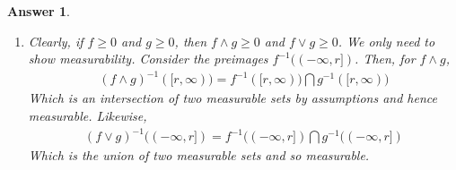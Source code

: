\documentclass[12pt]{article}
\theoremstyle{colon}
\newtheorem*{answer}{Answer}
\begin{document}
\begin{answer}
  \leavevmode
  \begin{enumerate}[label=\alph*)]
    \item Clearly, if $f \geq 0$ and $g \geq 0$, then $f \land g \geq 0$ and $f \lor g \geq 0$. We only need to show measurability. Consider the preimages $f^{-1}((-\infty, r])$. Then, for $f \land g$,
      \begin{gather*}
        (f \land g)^{-1}([r, \infty)) = f^{-1}([r, \infty)) \bigcap g^{-1}([r, \infty))
      \end{gather*}
      Which is an intersection of two measurable sets by assumptions and hence measurable. Likewise,
      \begin{gather*}
        (f \lor g)^{-1}((-\infty, r]) = f^{-1}((-\infty, r]) \bigcap g^{-1}((-\infty, r])
      \end{gather*}
      Which is the union of two measurable sets and so measurable.


\end{enumerate}
\end{answer}
\end{document}
